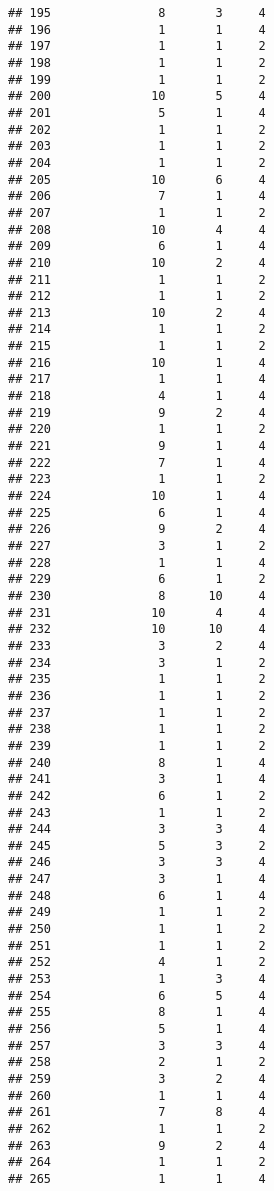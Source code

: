 \documentclass[
]{article}
\begin{document}
\begin{verbatim}
## 195               8       3     4
## 196               1       1     4
## 197               1       1     2
## 198               1       1     2
## 199               1       1     2
## 200              10       5     4
## 201               5       1     4
## 202               1       1     2
## 203               1       1     2
## 204               1       1     2
## 205              10       6     4
## 206               7       1     4
## 207               1       1     2
## 208              10       4     4
## 209               6       1     4
## 210              10       2     4
## 211               1       1     2
## 212               1       1     2
## 213              10       2     4
## 214               1       1     2
## 215               1       1     2
## 216              10       1     4
## 217               1       1     4
## 218               4       1     4
## 219               9       2     4
## 220               1       1     2
## 221               9       1     4
## 222               7       1     4
## 223               1       1     2
## 224              10       1     4
## 225               6       1     4
## 226               9       2     4
## 227               3       1     2
## 228               1       1     4
## 229               6       1     2
## 230               8      10     4
## 231              10       4     4
## 232              10      10     4
## 233               3       2     4
## 234               3       1     2
## 235               1       1     2
## 236               1       1     2
## 237               1       1     2
## 238               1       1     2
## 239               1       1     2
## 240               8       1     4
## 241               3       1     4
## 242               6       1     2
## 243               1       1     2
## 244               3       3     4
## 245               5       3     2
## 246               3       3     4
## 247               3       1     4
## 248               6       1     4
## 249               1       1     2
## 250               1       1     2
## 251               1       1     2
## 252               4       1     2
## 253               1       3     4
## 254               6       5     4
## 255               8       1     4
## 256               5       1     4
## 257               3       3     4
## 258               2       1     2
## 259               3       2     4
## 260               1       1     4
## 261               7       8     4
## 262               1       1     2
## 263               9       2     4
## 264               1       1     2
## 265               1       1     4

\end{verbatim}
\end{document}

